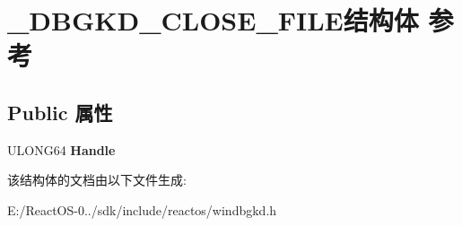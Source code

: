 \hypertarget{struct___d_b_g_k_d___c_l_o_s_e___f_i_l_e}{}\section{\+\_\+\+D\+B\+G\+K\+D\+\_\+\+C\+L\+O\+S\+E\+\_\+\+F\+I\+L\+E结构体 参考}
\label{struct___d_b_g_k_d___c_l_o_s_e___f_i_l_e}
\subsection*{Public 属性}
\begin{DoxyCompactItemize}
\item 
\mbox{\label{struct___d_b_g_k_d___c_l_o_s_e___f_i_l_e_a0ded91fa398bc12a5728bdd6fa2199bf}} 
U\+L\+O\+N\+G64 {\bfseries Handle}
\end{DoxyCompactItemize}


该结构体的文档由以下文件生成\+:\begin{DoxyCompactItemize}
\item 
E\+:/\+React\+O\+S-\/0../sdk/include/reactos/windbgkd.\+h\end{DoxyCompactItemize}
